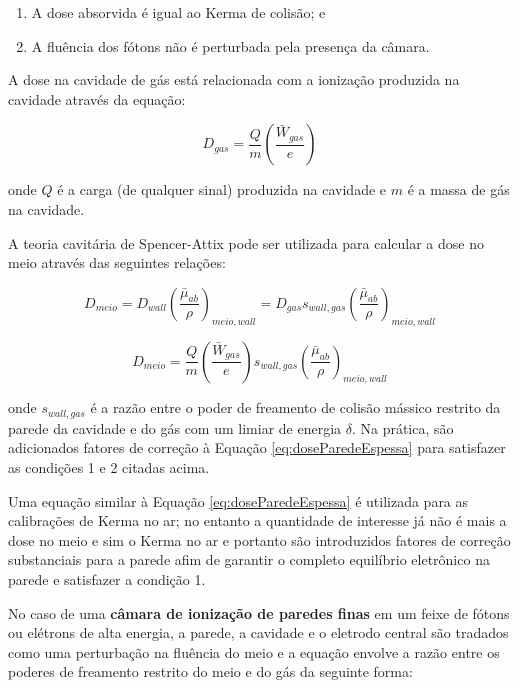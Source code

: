 \documentclass[11pt,a4paper]{article}
\begin{document}
			\begin{enumerate}
				\item A dose absorvida é igual ao Kerma de colisão; e
				\item A fluência dos fótons não é perturbada pela presença da câmara.
			\end{enumerate}

			A dose na cavidade de gás está relacionada com a ionização produzida na cavidade através da equação:

				\begin{equation}
					D_{gas} = \frac{Q}{m}\left(\frac{\bar{W}_{gas}}{e}\right)
				\end{equation}

			\noindent onde $Q$ é a carga (de qualquer sinal) produzida na cavidade e $m$ é a massa de gás na cavidade.

			A teoria cavitária de Spencer-Attix pode ser utilizada para calcular a dose no meio através das seguintes relações:

			$$D_{meio} = D_{wall} \left(\frac{\bar{\mu}_{ab}}{\rho}\right)_{meio, wall} = D_{gas} s_{wall, gas}\left(\frac{\bar{\mu}_{ab}}{\rho}\right)_{meio, wall}$$

			\begin{equation}
				D_{meio} = \frac{Q}{m}\left(\frac{\bar{W}_{gas}}{e}\right)s_{wall, gas}\left(\frac{\bar{\mu}_{ab}}{\rho}\right)_{meio, wall}
				\label{eq:doseParedeEspessa}
			\end{equation}

			\noindent onde $s_{wall, gas}$ é a razão entre o poder de freamento de colisão mássico restrito da parede da cavidade e do gás com um limiar de energia $\delta$. Na prática, são adicionados fatores de correção à Equação \ref{eq:doseParedeEspessa} para satisfazer as condições 1 e 2 citadas acima.

			Uma equação similar à Equação \ref{eq:doseParedeEspessa} é utilizada para as calibrações de Kerma no ar; no entanto a quantidade de interesse já não é mais a dose no meio e sim o Kerma no ar e portanto são introduzidos fatores de correção substanciais para a parede afim de garantir o completo equilíbrio eletrônico na parede e satisfazer a condição 1.

			No caso de uma \textbf{\textcolor{CarnationPink}{câmara de ionização de paredes finas}} em um feixe de fótons ou elétrons de alta energia, a parede, a cavidade e o eletrodo central são tradados como uma perturbação na fluência do meio e a equação envolve a razão entre os poderes de freamento restrito do meio e do gás da seguinte forma:
\end{document}
